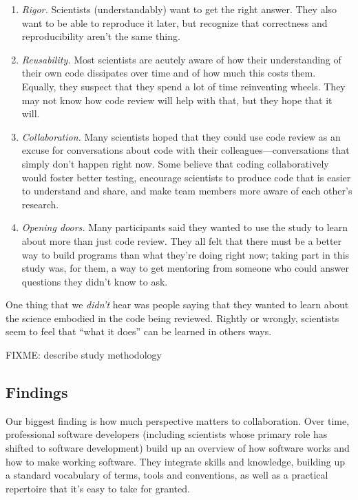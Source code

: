 \documentclass[10pt,twocolumn]{article}
\begin{document}
\begin{enumerate}

\item \emph{Rigor.}
Scientists (understandably) want to get the right answer.
They also want to be able to reproduce it later,
but recognize that correctness and reproducibility aren't the same thing.

\item \emph{Reusability.}
Most scientists are acutely aware of how their understanding of their own code dissipates over time
and of how much this costs them.
Equally,
they suspect that they spend a lot of time reinventing wheels.
They may not know how code review will help with that,
but they hope that it will.

\item \emph{Collaboration.}
Many scientists hoped that they could use code review as an excuse for conversations about code with their colleagues---conversations
that simply don't happen right now.
Some believe that coding collaboratively would foster better testing,
encourage scientists to produce code that is easier to understand and share,
and make team members more aware of each other's research.

\item \emph{Opening doors.}
Many participants said they wanted to use the study to learn about more than just code review.
They all felt that there must be a better way to build programs than what they're doing right now;
taking part in this study was,
for them,
a way to get mentoring from someone who could answer questions they didn't know to ask.

\end{enumerate}

One thing that we \emph{didn't} hear was people saying that they wanted to learn about the science embodied in the code being reviewed.
Rightly or wrongly, scientists seem to feel that ``what it does'' can be learned in others ways.

FIXME: describe study methodology

\subsection*{Findings}

Our biggest finding is how much perspective matters to collaboration.
Over time,
professional software developers (including scientists whose primary role has shifted to software development)
build up an overview of how software works and how to make working software.
They integrate skills and knowledge,
building up a standard vocabulary of terms, tools and conventions,
as well as a practical repertoire that it's easy to take for granted.
\end{document}

